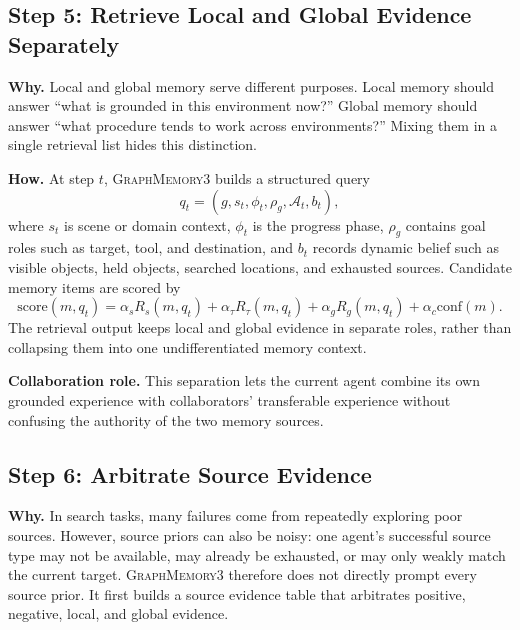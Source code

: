 \documentclass[11pt]{article}
\newcommand{\modelname}{\textsc{GraphMemory3}\xspace}
\newcommand{\actions}{\mathcal{A}}
\begin{document}
\subsection{Step 5: Retrieve Local and Global Evidence Separately}

\textbf{Why.} Local and global memory serve different purposes. Local memory should
answer ``what is grounded in this environment now?'' Global memory should answer
``what procedure tends to work across environments?'' Mixing them in a single
retrieval list hides this distinction.

\textbf{How.} At step $t$, \modelname builds a structured query
\begin{equation}
    q_t =
    \left(g, s_t, \phi_t, \rho_g, \actions_t, b_t\right),
\end{equation}
where $s_t$ is scene or domain context, $\phi_t$ is the progress phase, $\rho_g$
contains goal roles such as target, tool, and destination, and $b_t$ records
dynamic belief such as visible objects, held objects, searched locations, and
exhausted sources. Candidate memory items are scored by
\begin{equation}
    \mathrm{score}(m,q_t)
    =
    \alpha_s R_s(m,q_t)
    + \alpha_{\tau} R_{\tau}(m,q_t)
    + \alpha_g R_g(m,q_t)
    + \alpha_c \mathrm{conf}(m).
\end{equation}
The retrieval output keeps local and global evidence in separate roles, rather
than collapsing them into one undifferentiated memory context.

\textbf{Collaboration role.} This separation lets the current agent combine its
own grounded experience with collaborators' transferable experience without
confusing the authority of the two memory sources.

\subsection{Step 6: Arbitrate Source Evidence}

\textbf{Why.} In search tasks, many failures come from repeatedly exploring poor
sources. However, source priors can also be noisy: one agent's successful source
type may not be available, may already be exhausted, or may only weakly match the
current target. \modelname therefore does not directly prompt every source prior.
It first builds a source evidence table that arbitrates positive, negative, local,
and global evidence.
\end{document}
